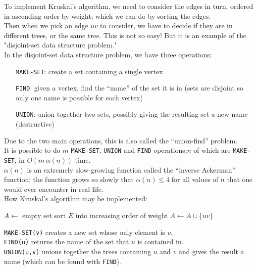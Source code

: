 \documentclass[12pt]{article}
\theoremstyle{plain}
\theoremstyle{definition}
\begin{document}
To implement Kruskal's algorithm, we need to consider the edges in turn, ordered in ascending order by weight;
which we can do by sorting the edges. \\
Then when we pick an edge $uv$ to consider, we have to decide if they are in different trees, or the same tree.
This is not so easy!
But it is an example of the "disjoint-set data structure problem." \\

In the disjoint-set data structure problem, we have three operations:
\begin{itemize}
  \item[\texttt{MAKE-SET}:] create a set containing a single vertex
  \item[\texttt{FIND}:] given a vertex, find the ``name'' of the set it is in (sets are disjoint so only one name is possible for each vertex)
  \item[\texttt{UNION}:] union together two sets, possibly giving the resulting set a new name (destructive)
\end{itemize}

Due to the two main operations, this is also called the ``union-find'' problem. \\

It is possible to do $m$ \texttt{MAKE-SET}, \texttt{UNION} and \texttt{FIND} operations,$n$ of which are \texttt{MAKE-SET}, in $O(m~\alpha(n))$ time. \\
$\alpha(n)$ is an extremely slow-growing function called the ``inverse Ackerman'' function;
the function grows so slowly that $\alpha(n) \leq 4$ for all values of $n$ that one would ever encounter in real life. \\

How Kruskal's algorithm may be implemented:
\begin{algorithmic}
  \State $A \gets$ empty set
    \State {}
  \EndFor
  \State sort $E$ into increasing order of weight
      \State $A \gets A \cup \{uv\}$
      \State {}
    \EndIf
  \EndFor
  \State {}
\EndFunction
\end{algorithmic}

\texttt{MAKE-SET(v)} creates a new set whose only element is $v$. \\
\texttt{FIND(u)} returns the name of the set that $u$ is contained in. \\
\texttt{UNION(u,v)} unions together the trees containing $u$ and $v$ and gives the result a name (which can be found with \texttt{FIND}). \\
\end{document}
